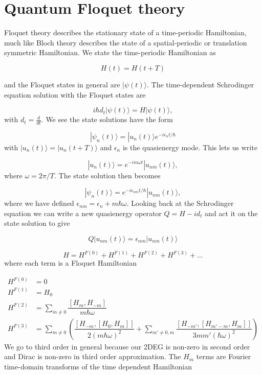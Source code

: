 \section{Quantum Floquet theory} \label{app:quantum-floquet-theory}
Floquet theory describes the stationary state of a time-periodic Hamiltonian, much like Bloch theory describes the state of a spatial-periodic or translation symmetric Hamiltonian.
We state the time-periodic Hamiltonian as

\begin{equation}
  H(t) = H(t+T)
\end{equation}

and the Floquet states in general are $|\psi(t)\rangle$.
The time-dependent Schrodinger equation solution with the Floquet states are

\begin{equation}
  i\hbar d_t |\psi(t)\rangle = H |\psi(t)\rangle,
\end{equation}
with $d_t = \tfrac{d}{dt}$.
We see the state solutions have the form

\begin{equation}
  |\psi_n (t) \rangle = |u_n (t)\rangle e^{-i\epsilon_n t / \hbar}
\end{equation}
with $|u_n (t)\rangle = |u_n (t+T)\rangle$ and $\epsilon_n$ is the quasienergy mode.
This lets us write

\begin{equation}
  |u_n (t) \rangle = e^{-im\omega t} |u_{nm} (t) \rangle,
\end{equation}
where $\omega = 2\pi/T$.
The state solution then becomes

\begin{equation}
  |\psi_n (t) \rangle = e^{-i\epsilon_{nm} t / \hbar} |u_{nm} (t) \rangle,
\end{equation}
where we have defined $\epsilon_{nm} = \epsilon_n + m \hbar \omega$.
Looking back at the Schrodinger equation we can write a new quasienergy operator $Q = H - id_t$ and act it on the state solution to give

\begin{equation}
  Q|u_{nm} (t)\rangle = \epsilon_{nm} |u_{nm} (t) \rangle
\end{equation}

\begin{equation}
  H = H^{F(0)} + H^{F(1)} + H^{F(2)} + H^{F(3)} + \dots
\end{equation}
where each term is a Floquet Hamiltonian

\begin{align}
  H^{F(0)} &= 0 \\
  H^{F(1)} &= H_0 \\
  H^{F(2)} &= \sum_{m\neq 0} \dfrac{[H_m, H_{-m}]}{m\hbar\omega} \\
  H^{F(3)} &= \sum_{m\neq 0} \left( \dfrac{[H_{-m} , [H_0, H_m]]}{2(m\hbar\omega)^2} + \sum_{m'\neq 0, m} \dfrac{[H_{-m'}, [H_{m'-m}, H_m]]}{3mm'(\hbar\omega)^2} \right)
\end{align}
We go to third order in general because our 2DEG is non-zero in second order and Dirac is non-zero in third order approximation.
The $H_m$ terms are Fourier time-domain transforms of the time dependent Hamiltonian

